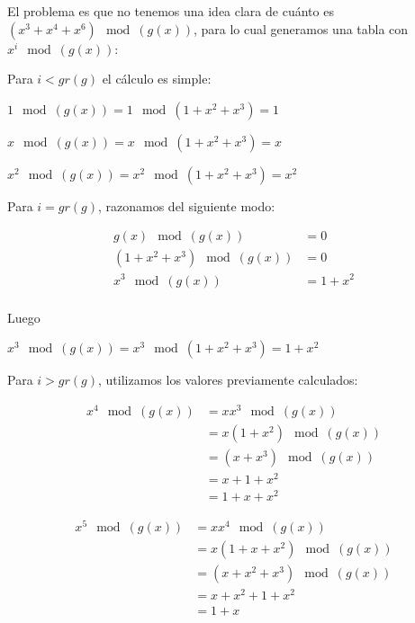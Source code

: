 \documentclass[10pt,a4paper]{article}
\begin{document}
El problema es que no tenemos una idea clara de cuánto es $(x^3+x^4+x^6) \mod (g(x))$, para lo cual generamos una tabla con $x^i \mod (g(x))$:

Para $i < gr(g)$ el cálculo es simple:

\begin{center}
$1 \mod (g(x)) = 1\mod (1+x^2+x^3) = 1 $
\end{center}

\begin{center}
$x \mod (g(x)) = x\mod (1+x^2+x^3) = x$
\end{center}

\begin{center}
$x^2 \mod (g(x)) = x^2\mod (1+x^2+x^3) = x^2$
\end{center}

Para $i = gr(g)$, razonamos del siguiente modo:

\begin{center}
\begin{align*} g(x) \mod (g(x)) &= 0\\ (1 + x^2 + x^3) \mod (g(x)) &= 0\\ x^3 \mod (g(x)) &= 1 + x^2\\ \end{align*}
\end{center}

Luego

\begin{center}
$x^3 \mod (g(x)) = x^3\mod (1+x^2+x^3) = 1 + x^2$
\end{center}

Para $i > gr(g)$, utilizamos los valores previamente calculados:

\begin{center}
\begin{align*} x^4 \mod (g(x)) &= xx^3 \mod(g(x))\\ &= x(1+x^2) \mod (g(x))\\ &= (x + x^3) \mod (g(x))\\ &= x + 1+ x^2\\ &= 1 + x + x^2 \end{align*}
\end{center}

\begin{center}
\begin{align*} x^5 \mod (g(x)) &= xx^4 \mod(g(x))\\ &= x(1+x + x^2) \mod (g(x))\\ &= (x + x^2 +x^3) \mod (g(x))\\ &= x + x^ 2+ 1 +x ^2\\ &= 1 + x \end{align*}
\end{center}
\end{document}
